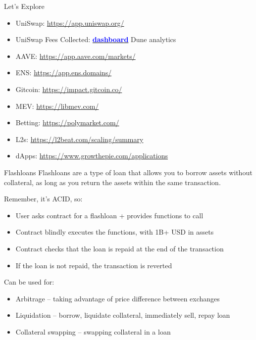 \documentclass[aspectratio=169]{beamer}
\newcommand{\bluelink}[2]{\href{#1}{\textcolor{blue}{\textbf{#2}}}}
\begin{document}
\begin{frame}{Let's Explore}
\begin{itemize}
    \item UniSwap: \url{https://app.uniswap.org/}
    \item UniSwap Fees Collected: \bluelink{https://dune.com/gammastrategies/Uniswap-v3-Volume-and-Fees-Collected}{dashboard} Dune analytics
    \item AAVE: \url{https://app.aave.com/markets/}
    \item ENS: \url{https://app.ens.domains/}
    \item Gitcoin: \url{https://impact.gitcoin.co/}
    \item MEV: \url{https://libmev.com/}
    \item Betting: \url{https://polymarket.com/}
    \item L2s: \url{https://l2beat.com/scaling/summary}
    \item dApps: \url{https://www.growthepie.com/applications}
\end{itemize}
\end{frame}


\begin{frame}{Flashloans}
Flashloans are a type of loan that allows you to borrow assets without
collateral, as long as you return the assets within the same transaction.
\bigskip

Remember, it's ACID, so:
\begin{itemize}
\item User asks contract for a flashloan + provides functions to call
\item Contract blindly executes the functions, with 1B+ USD in assets
\item Contract checks that the loan is repaid at the end of the transaction
\item If the loan is not repaid, the transaction is reverted
\end{itemize}
\smallskip

Can be used for:
\begin{itemize}
    \item Arbitrage -- taking advantage of price difference between exchanges
    \item Liquidation -- borrow, liquidate collateral, immediately sell, repay loan
    \item Collateral swapping -- swapping collateral in a loan
\end{itemize}
\end{frame}
\end{document}
